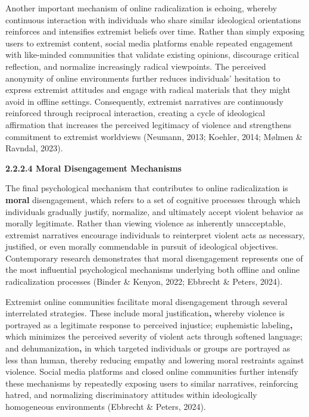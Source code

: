 \documentclass[11pt,a4paper]{article}
\begin{document}
	Another important mechanism of online radicalization is echoing, whereby continuous interaction with individuals who share similar ideological orientations reinforces and intensifies extremist beliefs over time. Rather than simply exposing users to extremist content, social media platforms enable repeated engagement with like-minded communities that validate existing opinions, discourage critical reflection, and normalize increasingly radical viewpoints. The perceived anonymity of online environments further reduces individuals' hesitation to express extremist attitudes and engage with radical materials that they might avoid in offline settings. Consequently, extremist narratives are continuously reinforced through reciprocal interaction, creating a cycle of ideological affirmation that increases the perceived legitimacy of violence and strengthens commitment to extremist worldviews (Neumann, 2013; Koehler, 2014; Mølmen \& Ravndal, 2023).
	
	\textbf{2.2.2.4 Moral Disengagement Mechanisms}
	
	The final psychological mechanism that contributes to online radicalization is \textbf{moral }disengagement, which refers to a set of cognitive processes through which individuals gradually justify, normalize, and ultimately accept violent behavior as morally legitimate. Rather than viewing violence as inherently unacceptable, extremist narratives encourage individuals to reinterpret violent acts as necessary, justified, or even morally commendable in pursuit of ideological objectives. Contemporary research demonstrates that moral disengagement represents one of the most influential psychological mechanisms underlying both offline and online radicalization processes (Binder \& Kenyon, 2022; Ebbrecht \& Peters, 2024).
	
	Extremist online communities facilitate moral disengagement through several interrelated strategies. These include moral justification\textbf{,} whereby violence is portrayed as a legitimate response to perceived injustice; euphemistic labeling\textbf{,} which minimizes the perceived severity of violent acts through softened language; and dehumanization\textbf{,} in which targeted individuals or groups are portrayed as less than human, thereby reducing empathy and lowering moral restraints against violence. Social media platforms and closed online communities further intensify these mechanisms by repeatedly exposing users to similar narratives, reinforcing hatred, and normalizing discriminatory attitudes within ideologically homogeneous environments (Ebbrecht \& Peters, 2024).
	
\end{document}
